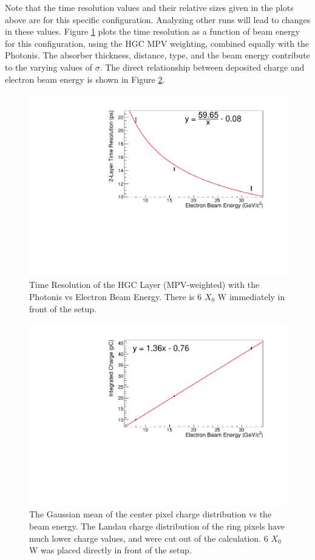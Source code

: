 \documentclass[twocolumn,aps,prd,reprint,superscriptaddress,floatfix]{revtex4-1}
\begin{document}
Note that the time resolution values and their relative sizes given in the plots above are for this specific configuration.
Analyzing other runs will lead to changes in these values. 
Figure \ref{fig:resplot} plots the time resolution as a function of beam energy for this configuration, using the HGC MPV weighting, combined equally with the Photonis.
The absorber thickness, distance, type, and the beam energy contribute to the varying values of $\sigma$.
The direct relationship between deposited charge and electron beam energy is shown in Figure \ref{fig:chargemean}.

\begin{figure}
\centering
	\includegraphics[width=\linewidth]{resplot.pdf}
    \caption{Time Resolution of the HGC Layer (MPV-weighted) with the Photonis vs Electron Beam Energy.
    There is 6 $X_0$ W immediately in front of the setup.
    }
    \label{fig:resplot}
\end{figure}

\begin{figure}[!htbp]
\centering
	\includegraphics[width=\linewidth]{chargemean.pdf}
    \caption{The Gaussian mean of the center pixel charge distribution vs the beam energy.
    The Landau charge distribution of the ring pixels have much lower charge values, and were cut out of the calculation.
    6 $X_0$ W was placed directly in front of the setup.}
    \label{fig:chargemean}
\end{figure}
\end{document}
